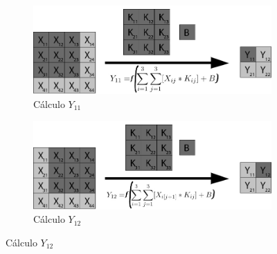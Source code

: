 \begin{figure}[H]
	\centering
	\begin{subfigure}{.5\textwidth}
		\hspace{-10mm}
		\includegraphics[width=1.2\linewidth]{imagenes/conv_1.jpg}  
		\caption{Cálculo $Y_{11}$}
	\end{subfigure}%
	\begin{subfigure}{.5\textwidth}
		\hspace{10mm}
		\includegraphics[width=1.2\linewidth]{imagenes/conv_2.jpg}  
		\caption{Cálculo $Y_{12}$}
	\end{subfigure}
	

\end{figure}
